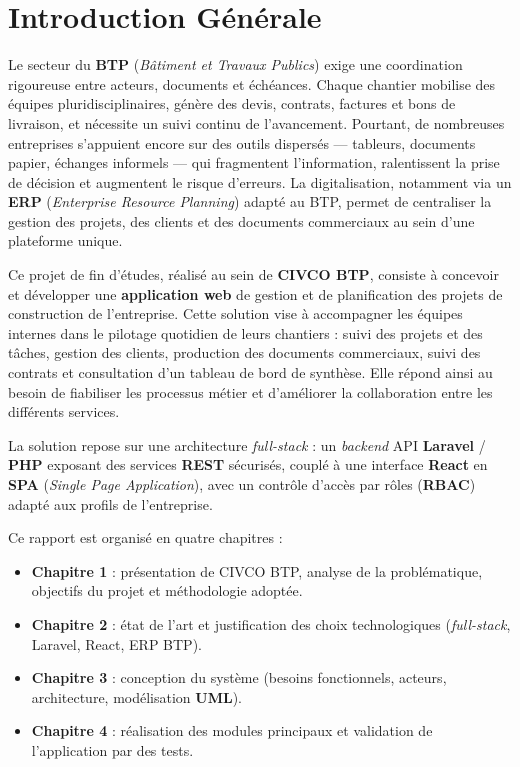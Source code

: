 \chapter*{Introduction Générale}

Le secteur du \textbf{BTP} (\textit{Bâtiment et Travaux Publics}) exige une coordination
rigoureuse entre acteurs, documents et échéances. Chaque chantier mobilise des équipes
pluridisciplinaires, génère des devis, contrats, factures et bons de livraison, et nécessite
un suivi continu de l'avancement. Pourtant, de nombreuses entreprises s'appuient encore sur
des outils dispersés --- tableurs, documents papier, échanges informels --- qui fragmentent
l'information, ralentissent la prise de décision et augmentent le risque d'erreurs. La
digitalisation, notamment via un \textbf{ERP} (\textit{Enterprise Resource Planning}) adapté
au BTP, permet de centraliser la gestion des projets, des clients et des documents commerciaux
au sein d'une plateforme unique.

\medskip

Ce projet de fin d'études, réalisé au sein de \textbf{CIVCO BTP}, consiste à concevoir et
développer une \textbf{application web} de gestion et de planification des projets de
construction de l'entreprise. Cette solution vise à accompagner les équipes internes dans le
pilotage quotidien de leurs chantiers : suivi des projets et des tâches, gestion des clients,
production des documents commerciaux, suivi des contrats et consultation d'un tableau de bord
de synthèse. Elle répond ainsi au besoin de fiabiliser les processus métier et d'améliorer la
collaboration entre les différents services.

\medskip

La solution repose sur une architecture \textit{full-stack} : un \textit{backend} API
\textbf{Laravel} / \textbf{PHP} exposant des services \textbf{REST} sécurisés, couplé à une
interface \textbf{React} en \textbf{SPA} (\textit{Single Page Application}), avec un contrôle
d'accès par rôles (\textbf{RBAC}) adapté aux profils de l'entreprise.

\medskip

Ce rapport est organisé en quatre chapitres :
\begin{itemize}
  \setlength{\itemsep}{0pt}
  \item \textbf{Chapitre 1} : présentation de CIVCO BTP, analyse de la problématique,
  objectifs du projet et méthodologie adoptée.
  \item \textbf{Chapitre 2} : état de l'art et justification des choix technologiques
  (\textit{full-stack}, Laravel, React, ERP BTP).
  \item \textbf{Chapitre 3} : conception du système (besoins fonctionnels, acteurs, architecture,
  modélisation \textbf{UML}).
  \item \textbf{Chapitre 4} : réalisation des modules principaux et validation de
  l'application par des tests.
\end{itemize}

\newpage
